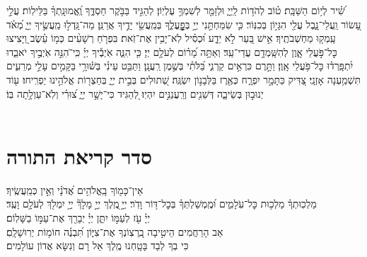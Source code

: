 \documentclass[twoside, openany, parskip=half, 11pt]{book}
\begin{document}
שִׁ֝֗יר לְי֥וֹם הַשַּׁבָּֽת׃
ט֗וֹב לְהֹד֥וֹת לַֽיְיָ֑ וּלְזַמֵּ֖ר לְשִׁמְךָ֣ עֶלְיֽוֹן׃
לְהַגִּ֣יד בַּבֹּ֣קֶר חַסְדֶּ֑ךָ וֶֽ֝אֱמוּנָֽתְךָ֗ בַּלֵּילֽוֹת׃
עֲלֵ֣י עָ֭שׂוֹר וַֽעֲלֵי־נָ֑בֶל עֲלֵ֖י הִגָּי֣וֹן בְּכִנּֽוֹר׃
כִּ֤י שִׂמַּחְתַּ֣נִי יְיָ֣ בְּפׇׇׇׇׇׇׇֽעֳלֶ֑ךָ בְּמַֽעֲשֵׂ֖י יָדֶ֣יךָ אֲרַנֵּֽן׃
מַה־גָּֽדְל֣וּ מַֽעֲשֶׂ֣יךָ יְיָ֑ מְ֝אֹ֗ד עָֽמְק֥וּ מַחְשְׁבֹתֶֽיךָ׃
אִ֣ישׁ בַּ֭עַר לֹ֣א יֵדָ֑ע וּ֝כְסִ֗יל לֹֽא־יָבִ֥ין אֶת־זֹֽאת׃
בִּפְרֹ֤חַ רְשָׁעִ֨ים כְּמ֥וֹ עֵ֗שֶׂב וַ֭יָּצִיצוּ כׇּל־פֹּ֣עֲלֵי אָ֑וֶן לְהִשָּֽׁמְדָ֥ם עֲדֵי־עַֽד׃
וְאַתָּ֥ה מָ֝ר֗וֹם לְעֹלָ֥ם יְיָ׃
כִּ֤י הִנֵּ֢ה אֹֽיְבֶ֡יךָ יְיָ֗ כִּֽי־ֹהִנֵּ֣ה אֹֽיְבֶ֣יךָ יֹאבֵ֑דוּ יִ֝תְפָּֽרְד֗וּ כׇּל־פֹּ֥עֲלֵי אָֽוֶן׃
וַתָּ֣רֶם כִּרְאֵ֣ים קַרְנִ֑י בַּ֝לֹּתִ֗י בְּשֶׁ֣מֶן רַֽעֲנָֽן׃
וַתַּבֵּ֥ט עֵינִ֗י בְּשׁ֫וּרָ֥י בַּקָּמִ֣ים עָלַ֣י מְרֵעִ֑ים תִּשְׁמַ֥עְנָה אָזְנָֽי׃
צַ֭דִּיק כַּתָּמָ֣ר יִפְרָ֑ח כְּאֶ֖רֶז בַּלְּבָנ֣וֹן יִשְׂגֶּֽה׃
שְׁ֭תוּלִים בְּבֵ֣ית יְיָ֑ בְּחַצְר֖וֹת אֱלֹהֵ֣ינוּ יַפְרִֽיחוּ׃
ע֖וֹד יְנוּב֣וּן בְּשֵׂיבָ֑ה דְּשֵׁנִ֖ים וְרַֽעֲנַנִּ֣ים יִהְיֽוּ׃
לְ֭הַגִּיד כִּי־יָשָׁ֣ר יְיָ֑ צ֝וּרִ֗י וְלֹֽא־עַוְלָ֥תָה בּֽוֹ׃\\
\RChBarekhi
\ledavid\\
\mournerskaddish

\nextpage

\chapter[סדר קריאת התורה]{ סדר קריאת התורה }

אֵין־כָּמ֖וֹךָ בָֽאֱלֹהִ֥ים אֲ֝דֹנָ֗י וְאֵ֣ין כְּמַֽעֲשֶֽׂיךָ׃
\\
מַלְכֽוּתְךָ֗ מַלְכ֥וּת כׇּל־עֹֽלָמִ֑ים וּ֝מֶֽמְשַׁלְתְּךָ֗ בְּכׇל־דּ֥וֹר וָדֹֽר׃
יְיָ֣ ֖מֶֽלֶךְ
יְיָ֣ מָלָךְ֘
יְיָ֥ יִמְלֹ֖ךְ לְעֹלָ֥ם וָעֶֽד׃
\\
יְיָ֗ עֹ֖ז לְעַמּ֣וֹ יִתֵּ֑ן יְיָ֓ יְבָרֵ֖ךְ אֶת־עַמּ֣וֹ בַשָּׁלֽוֹם׃
\\
אַב הָרַחֲמִים הֵיטִ֣יבָה בִֽ֭רְצֽוֹנְךָ אֶת־צִיּ֑וֹן תִּ֝בְנֶ֗ה חוֹמ֥וֹת יְרֽוּשָׁלָֽםִ׃
\\
כִּי בְךָ לְבַד בָּטָֽחְנוּ מֶֽלֶךְ אֵל רָם וְנִשָּׂא אֲדוֹן עוֹלָמִים׃





\pesicha
\end{document}
